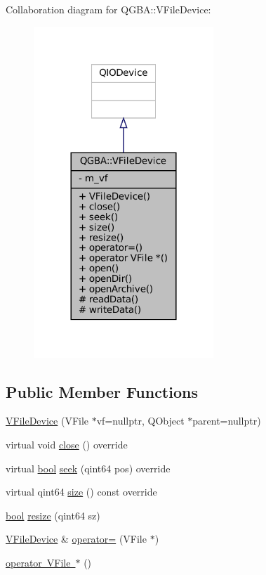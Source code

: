 Collaboration diagram for Q\+G\+BA\+:\+:V\+File\+Device\+:
\nopagebreak
\begin{figure}[H]
\begin{center}
\leavevmode
\includegraphics[width=192pt]{class_q_g_b_a_1_1_v_file_device__coll__graph}
\end{center}
\end{figure}
\subsection*{Public Member Functions}
\begin{DoxyCompactItemize}
\item 
\mbox{\hyperlink{class_q_g_b_a_1_1_v_file_device_a272c76b9fc8dc547945f789c0cea68a4}{V\+File\+Device}} (V\+File $\ast$vf=nullptr, Q\+Object $\ast$parent=nullptr)
\item 
virtual void \mbox{\hyperlink{class_q_g_b_a_1_1_v_file_device_a724a90031db48ab047c48beaf3763b70}{close}} () override
\item 
virtual \mbox{\hyperlink{libretro_8h_a4a26dcae73fb7e1528214a068aca317e}{bool}} \mbox{\hyperlink{class_q_g_b_a_1_1_v_file_device_a4454f8254c8074592cb16a0c0edcd8d5}{seek}} (qint64 pos) override
\item 
virtual qint64 \mbox{\hyperlink{class_q_g_b_a_1_1_v_file_device_a0798006418f2d769eba5f472836c6b70}{size}} () const override
\item 
\mbox{\hyperlink{libretro_8h_a4a26dcae73fb7e1528214a068aca317e}{bool}} \mbox{\hyperlink{class_q_g_b_a_1_1_v_file_device_ab112e876255ade205c6d13fe08999552}{resize}} (qint64 sz)
\item 
\mbox{\hyperlink{class_q_g_b_a_1_1_v_file_device}{V\+File\+Device}} \& \mbox{\hyperlink{class_q_g_b_a_1_1_v_file_device_ac8d7a7f371540c41c7b8091b014effdb}{operator=}} (V\+File $\ast$)
\item 
\mbox{\hyperlink{class_q_g_b_a_1_1_v_file_device_a0d4c7a788715c253527c224aa77bc8cd}{operator V\+File $\ast$}} ()
\end{DoxyCompactItemize}
